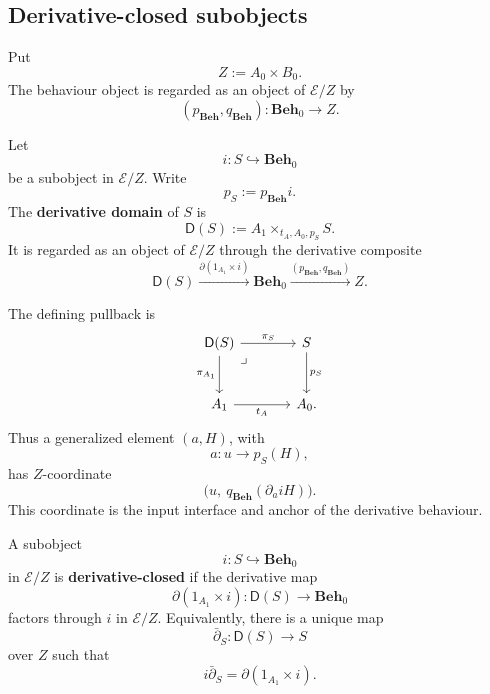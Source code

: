 \subsection{Derivative-closed subobjects}
\label{subsec:derivative-closed-subobjects}

Put
\[
    Z:=A_0\times B_0.
\]
The behaviour object is regarded as an object of \(\mathcal E/Z\) by
\[
    (p_{\mathbf{Beh}},q_{\mathbf{Beh}}):
    \mathbf{Beh}_0\to Z.
\]

\begin{definition}
\label{def:derivative-domain-subobject}
    Let
    \[
        i:S\hookrightarrow\mathbf{Beh}_0
    \]
    be a subobject in \(\mathcal E/Z\). Write
    \[
        p_S:=p_{\mathbf{Beh}}i.
    \]
    The \textbf{derivative domain} of \(S\) is
    \[
        \mathsf D(S):=
        A_1\times_{t_A,A_0,p_S}S.
    \]
    It is regarded as an object of \(\mathcal E/Z\) through the derivative composite
    \[
        \mathsf D(S)
            \xrightarrow{\partial(1_{A_1}\times i)}
        \mathbf{Beh}_0
            \xrightarrow{(p_{\mathbf{Beh}},q_{\mathbf{Beh}})}
        Z.
    \]
\end{definition}

The defining pullback is
\[
    \begin{tikzcd}[column sep=large, row sep=large]
            \mathsf D(S)
                \arrow[r, "\pi_S"]
                \arrow[d, "\pi_{A_1}"']
                \arrow[dr, phantom, "\lrcorner", very near start]
        &
            S
                \arrow[d, "p_S"]
        \\
            A_1
                \arrow[r, "t_A"']
        &
            A_0.
    \end{tikzcd}
\]
Thus a generalized element \((a,H)\), with
\[
    a:u\to p_S(H),
\]
has \(Z\)-coordinate
\[
    \bigl(u,\ q_{\mathbf{Beh}}(\partial_a iH)\bigr).
\]
This coordinate is the input interface and anchor of the derivative behaviour.

\begin{definition}
\label{def:derivative-closed-subobject}
    A subobject
    \[
        i:S\hookrightarrow\mathbf{Beh}_0
    \]
    in \(\mathcal E/Z\) is \textbf{derivative-closed} if the derivative map
    \[
        \partial(1_{A_1}\times i):
        \mathsf D(S)\to\mathbf{Beh}_0
    \]
    factors through \(i\) in \(\mathcal E/Z\). Equivalently, there is a unique
    map
    \[
        \bar\partial_S:\mathsf D(S)\to S
    \]
    over \(Z\) such that
    \[
        i\bar\partial_S
        =
        \partial(1_{A_1}\times i).
    \]
\end{definition}

